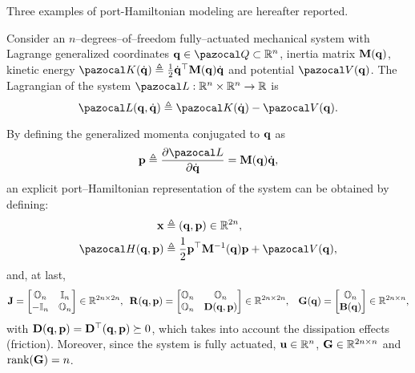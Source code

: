 %
Three examples of port-Hamiltonian modeling are hereafter reported.  
%
\begin{exmp}\label{ex:ndof}
	Consider an $n$--degrees--of--freedom fully--actuated mechanical system with Lagrange generalized coordinates $\q\in\Q\subset\R^n$, inertia matrix $\mathbf{M}(\mathbf{q})$, kinetic energy $\K(\dot{\q})\triangleq\frac{1}{2}\dot{\q}^\top \mathbf{M}(\q)\dot{\q}$ and potential $\V(\q)$. The Lagrangian of the system $\La:\R^n\times\R^n\rightarrow\R$ is
    \begin{equation}
        \La(\q,\dot{\q}) \triangleq  \K(\dot{\q}) - \V(\q).
    \end{equation}
    
    By defining the generalized momenta conjugated to $\mathbf{q}$ as
    \begin{equation}
        \p \triangleq \frac{\partial \La}{\partial \dot{\q}} = \mathbf{M}(\q)\dot{\q},
    \end{equation}
    an explicit port--Hamiltonian representation of the system can be obtained by defining:
	\begin{align}
	    \x &\triangleq (\q,\p)\in\R^{2n},\\
	    \Ha(\q,\p) &\triangleq\frac{1}{2}\p^\top\mathbf{M}^{-1}(\q)\p + \V(\q),
	\end{align}
	and, at last,
	\begin{align*}
	    \mathbf{J} = \begin{bmatrix}
	        \mathbb{O}_n&\mathbb{I}_n\\
	        -\mathbb{I}_n&\mathbb{O}_n
	    \end{bmatrix}\in\mathbb{R}^{2n\times 2n},~~ &
	    \mathbf{R}(\mathbf{q},\mathbf{p}) = \begin{bmatrix}
	        \mathbb{O}_n&\mathbb{O}_n\\\mathbb{O}_n&\mathbf{D}(\mathbf{q},\mathbf{p})
	    \end{bmatrix}\in\mathbb{R}^{2n\times 2n}, &
	    \mathbf{G}(\mathbf{q})=\begin{bmatrix}
	        \mathbb{O}_{n}\\\mathbf{B}(\mathbf{q})
	    \end{bmatrix}\in\mathbb{R}^{2n\times n},
	\end{align*}
	with $\mathbf{D}(\mathbf{q},\mathbf{p}) = \mathbf{D}^\top(\mathbf{q},\mathbf{p})\succeq 0$, which takes into account the dissipation effects (friction). Moreover, since the system is fully actuated, $\mathbf{u}\in\mathbb{R}^n$, $\mathbf{G}\in\mathbb{R}^{2n\times n}$ and $\text{rank}(\mathbf{G}) = n$.
	

\end{exmp}
